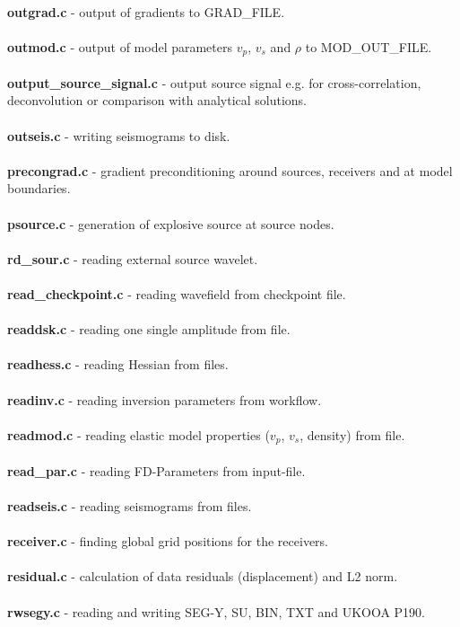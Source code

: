 \\
\textbf{outgrad.c} - output of gradients to GRAD\_FILE.\\
\\
\textbf{outmod.c} - output of model parameters $v_p$, $v_s$ and $\rho$ to MOD\_OUT\_FILE.\\
\\
\textbf{output\_source\_signal.c} - output source signal e.g. for cross-correlation, deconvolution or comparison with analytical solutions. \\
\\
\textbf{outseis.c} - writing seismograms to disk. \\
\\
\textbf{precongrad.c} - gradient preconditioning around sources, receivers and at model boundaries.\\
\\
\textbf{psource.c} - generation of explosive source at source nodes.\\
\\
\textbf{rd\_sour.c} - reading external source wavelet.\\
\\
\textbf{read\_checkpoint.c} - reading wavefield from checkpoint file.\\
\\
\textbf{readdsk.c} - reading one single amplitude from file.\\
\\
\textbf{readhess.c} - reading Hessian from files.\\
\\
\textbf{readinv.c} - reading inversion parameters from workflow.\\
\\
\textbf{readmod.c} - reading elastic model properties ($v_p$, $v_s$, density) from file.\\
\\
\textbf{read\_par.c} - reading FD-Parameters from input-file. \\
\\
\textbf{readseis.c} - reading seismograms from files.\\
\\
\textbf{receiver.c}  - finding global grid positions for the receivers.\\
\\
\textbf{residual.c} - calculation of data residuals (displacement) and L2 norm.\\
\\
\textbf{rwsegy.c} - reading and writing SEG-Y, SU, BIN, TXT and UKOOA P190.\\
